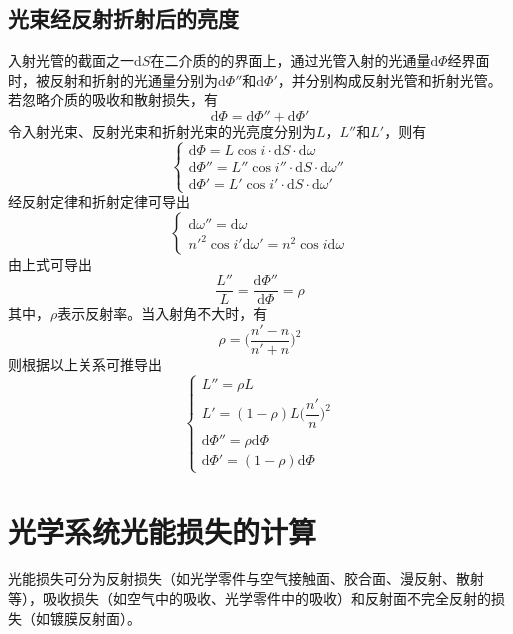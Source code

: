 \documentclass[cn,10pt,chinesefont=founder,math=mtpro2,cite=super,toc=onecol,twoside,openany]{elegantbook}
\begin{document}
\subsection{光束经反射折射后的亮度}
入射光管的截面之一$\mathrm{d}S$在二介质的的界面上，通过光管入射的光通量$\mathrm{d}\varPhi$经界面时，被反射和折射的光通量分别为$\mathrm{d}\varPhi''$和$\mathrm{d}\varPhi'$，并分别构成反射光管和折射光管。若忽略介质的吸收和散射损失，有
\begin{equation}
\mathrm{d}\varPhi=\mathrm{d}\varPhi''+\mathrm{d}\varPhi'
\end{equation}
令入射光束、反射光束和折射光束的光亮度分别为$L$，$L''$和$L'$，则有
\begin{equation}
\begin{cases}
\mathrm{d}\varPhi=L\cos i\cdot\mathrm{d}S\cdot\mathrm{d}\omega\\
\mathrm{d}\varPhi''=L''\cos i''\cdot\mathrm{d}S\cdot\mathrm{d}\omega''\\
\mathrm{d}\varPhi'=L'\cos i'\cdot\mathrm{d}S\cdot\mathrm{d}\omega'
\end{cases}
\end{equation}
经反射定律和折射定律可导出
\begin{equation}
\begin{cases}
\mathrm{d}\omega''=\mathrm{d}\omega\\
n'^2\cos i'\mathrm{d}\omega'=n^2\cos i\mathrm{d}\omega 
\end{cases}
\end{equation}
由上式可导出
\begin{equation}
\frac{L''}{L}=\frac{\mathrm{d}\varPhi''}{\mathrm{d}\varPhi}=\rho
\end{equation}
其中，$\rho$表示反射率。当入射角不大时，有
\begin{equation}
\rho=\bigg(\frac{n'-n}{n'+n}\bigg)^2
\end{equation}
则根据以上关系可推导出
\begin{equation}
\begin{cases}
L''=\rho L\\
L'=(1-\rho)L\bigg(\dfrac{n'}{n}\bigg)^2\\
\mathrm{d}\varPhi''=\rho\mathrm{d}\varPhi\\
\mathrm{d}\varPhi'=(1-\rho)\mathrm{d}\varPhi
\end{cases}
\end{equation}

\section{光学系统光能损失的计算}
光能损失可分为反射损失（如光学零件与空气接触面、胶合面、漫反射、散射等），吸收损失（如空气中的吸收、光学零件中的吸收）和反射面不完全反射的损失（如镀膜反射面）。
\end{document}
